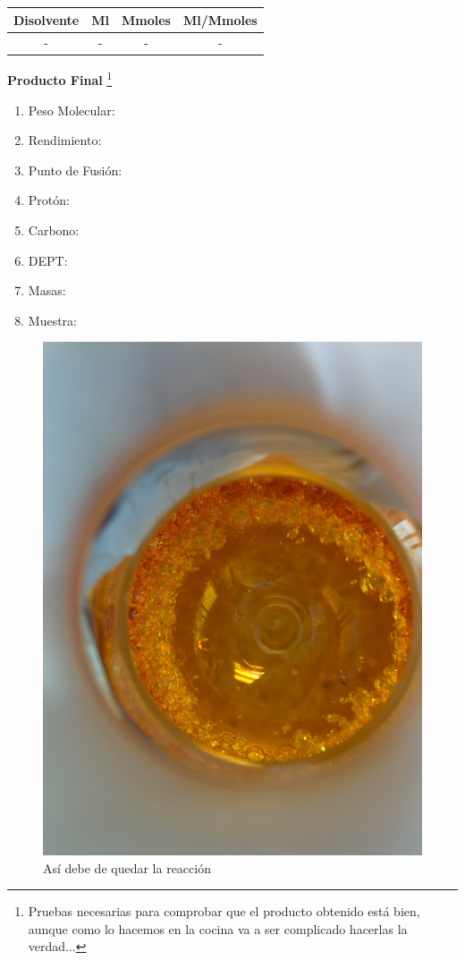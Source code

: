 \documentclass[a4paper]{book}
\begin{document}
\begin{table}[hbt]
\begin{center}
\begin{tabular}{|c|c|c|c|}
\hline
\textbf{Disolvente} & \textbf{Ml} & \textbf{Mmoles} & \textbf{Ml/Mmoles} \\
\hline
- & - & - & - \\
\hline
\end{tabular}
\end{center}
\end{table}

\newpage
\begin{large}
\textbf{Producto Final}
\footnote{Pruebas necesarias para comprobar que el producto obtenido está bien, aunque como lo hacemos en la cocina va a ser complicado hacerlas la verdad...}\\
\end{large}
\begin{enumerate}
\item Peso Molecular:
\item Rendimiento:
\item Punto de Fusión:
\item Protón:
\item Carbono:
\item DEPT:
\item Masas:
\item Muestra:
\end{enumerate}


\begin{center}
\begin{figure}[hbt]
\includegraphics[scale=0.07]{./1.jpg}
\caption{Así debe de quedar la reacción\textcopyright}
\end{figure}
\end{center}

\newpage

\cleardoublepage


\end{document}
